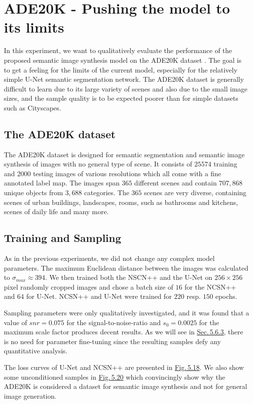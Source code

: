 \section[ADE20K - Pushing the model to its limits]{ADE20K - Pushing the model to its limits%
    } \label{sec:5.6}
In this experiment, we want to qualitatively evaluate the performance of the proposed semantic image synthesis model on the ADE20K dataset \cite{ade20k}. The goal is to get a feeling for the limits of the current model, especially for the relatively simple U-Net semantic segmentation network. The ADE20K dataset is generally difficult to learn due to its large variety of scenes and also due to the small image sizes, and the sample quality is to be expected poorer than for simple datasets such as Cityscapes. 
%
\subsection{The ADE20K dataset}
The ADE20K dataset \cite{ade20k}  is designed for semantic segmentation and semantic image synthesis of images with no general type of scene. It consists of $25574$ training and $2000$ testing images of various resolutions which all come with a fine annotated label map. The images span $365$ different scenes and contain $707{,}868$ unique objects from $3{,}688$ categories. The $365$ scenes are very diverse, containing scenes of urban buildings, landscapes, rooms, such as bathrooms and kitchens, scenes of daily life and many more. 
%
\subsection{Training and Sampling}
As in the previous experiments, we did not change any complex model parameters. The maximum Euclidean distance between the images was calculated to $\sigma_{max}\approx394$. We then trained both the NSCN++ and the U-Net on $256\times256$ pixel randomly cropped images and chose a batch size of $16$ for the NCSN++ and $64$ for U-Net. NCSN++ and U-Net were trained for $220$ resp. $150$ epochs.

Sampling parameters were only qualitatively investigated, and it was found that a value of $snr=0.075$ for the signal-to-noise-ratio and $s_0=0.0025$ for the maximum scale factor produces decent results. As we will see in \hyperref[sec:5.6.3]{Sec.\,5.6.3}, there is no need for parameter fine-tuning since the resulting samples defy any quantitative analysis.

The loss curves of U-Net and NCSN++ are presented in \hyperref[fig:5.18]{Fig.\,5.18}. We also show some unconditioned samples in \hyperref[fig:5.20]{Fig.\,5.20} which convincingly show why the ADE20K is considered a dataset for semantic image synthesis and not for general image generation.


